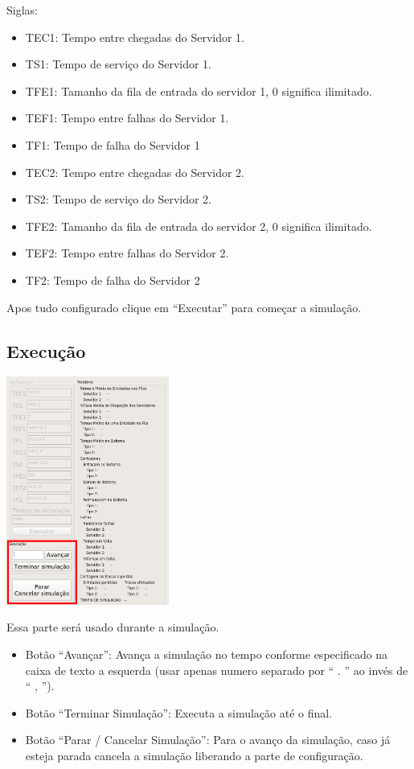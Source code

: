 \documentclass{article}
\begin{document}
Siglas:
\begin{itemize}
  \item TEC1: Tempo entre chegadas do Servidor 1.
  \item TS1: Tempo de serviço do Servidor 1.
  \item TFE1: Tamanho da fila de entrada do servidor 1, 0 significa ilimitado.
  \item TEF1: Tempo entre falhas do Servidor 1.
  \item TF1: Tempo de falha do Servidor 1
  \item TEC2: Tempo entre chegadas do Servidor 2.
  \item TS2: Tempo de serviço do Servidor 2.
  \item TFE2: Tamanho da fila de entrada do servidor 2, 0 significa ilimitado.
  \item TEF2: Tempo entre falhas do Servidor 2.
  \item TF2: Tempo de falha do Servidor 2
\end{itemize}

Apos tudo configurado clique em ``Executar'' para começar a simulação.

\subsection{Execução}
\begin{multicols}{2}
  \includegraphics[width=0.4\textwidth]{imgs/run.png}
\columnbreak

Essa parte será usado durante a simulação. 
\begin{itemize}
  \item Botão ``Avançar'': Avança a simulação no tempo conforme especificado na caixa de texto a esquerda (usar apenas numero separado por `` . '' ao invés de `` , ''). 
  \item Botão ``Terminar Simulação'': Executa a simulação até o final.
  \item Botão ``Parar / Cancelar Simulação'': Para o avanço da simulação, caso já esteja
    parada cancela a simulação liberando a parte de configuração.
\end{itemize}

\end{multicols}
\end{document}
